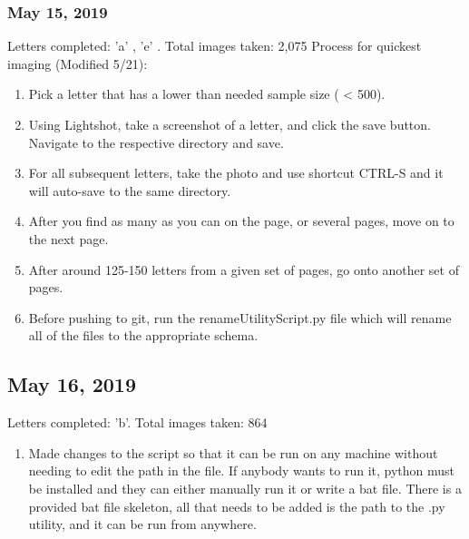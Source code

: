 \documentclass[12pt]{article} %
\begin{document}
\subsubsection{May 15, 2019}
Letters completed: 'a' , 'e' . \newline
Total images taken: 2,075 \newline
\noindent\makebox[\linewidth]{\rule{15cm}{0.4pt}}
\large{Process for quickest imaging (Modified 5/21):}
\begin{enumerate}[label = (\roman*)]
\item Pick a letter that has a lower than needed sample size ( < 500).
\item Using Lightshot, take a screenshot of a letter, and click the save button. Navigate to the respective directory and save.
\item For all subsequent letters, take the photo and use shortcut CTRL-S and it will auto-save to the same directory.
\item After you find as many as you can on the page, or several pages, move on to the next page.
\item After around 125-150 letters from a given set of pages, go onto another set of pages.
\item Before pushing to git, run the renameUtilityScript.py file which will rename all of the files to the appropriate schema.
\end{enumerate}

\subsection{May 16, 2019}
Letters completed: 'b'.\newline
Total images taken:  864\newline
\noindent\makebox[\linewidth]{\rule{15cm}{0.4pt}}
\begin{enumerate}[label = (\roman*)]
\item Made changes to the script so that it can be run on any machine without needing to edit the path in the file. If anybody wants to run it, python must be installed and they can either manually run it or write a bat file. There is a provided bat file skeleton, all that needs to be added is the path to the .py utility, and it can be run from anywhere.

\end{enumerate}
\end{document}

